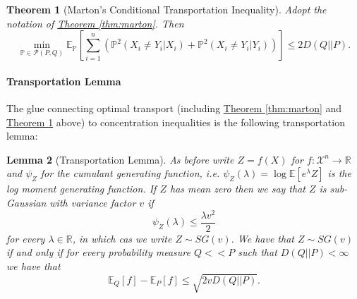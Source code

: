 \documentclass[reqno]{amsproc}
\newtheorem{theorem}{Theorem}
\newtheorem{lemma}[theorem]{Lemma}
\newcommand{\fref}[2]{\hyperref[#2]{#1 \ref*{#2}}}
\newcommand{\R}{\mathbb{R}}
\renewcommand{\P}{\mathbb{P}} %
\newcommand{\E}{\mathbb{E}} %
\begin{document}
	\begin{theorem}[Marton's Conditional Transportation Inequality]
	\label{thm:marton_cond}
	Adopt the notation of \fref{Theorem}{thm:marton}. Then 
		$$\min\limits_{\P \in \mathcal{P}(P,Q)} \E_{\P}\left[ \sum\limits_{i=1}^n \left(\P^2(X_i \ne Y_i|X_i) + \P^2(X_i \ne Y_i|Y_i)\right)\right] \leq 2D(Q||P).$$
	\end{theorem}

	\paragraph{\textbf{Transportation Lemma}}
	The glue connecting optimal transport (including \fref{Theorem}{thm:marton} and \fref{Theorem}{thm:marton_cond} above) to concentration inequalities is the following transportation lemma:

	\begin{lemma}[Transportation Lemma]
	\label{lem:transp}
		As before write $Z = f(X)$ for $f:\mathcal{X}^n \to \R$ and $\psi_Z$ for the cumulant generating function, i.e. $\psi_Z (\lambda) = \log \E [ e^\lambda Z]$
		is the log moment generating function.
		If $Z$ has mean zero then we say that $Z$ is \emph{sub-Gaussian} with \emph{variance factor} $v$ if $$\psi_Z(\lambda) \leq \frac{\lambda v^2}{2}$$ for every $\lambda\in\R$,
		in which cas we write $Z\sim SG(v)$.
		We have that $Z \sim SG(v)$ if and only if for every probability measure $Q << P$ such that $D(Q||P) < \infty$ we have that 
		\begin{equation}
		\label{eqn:transpo}
			\E_Q[f] - \E_P[f] \leq \sqrt{2vD(Q||P)}.
		\end{equation}
	\end{lemma}
\end{document}
